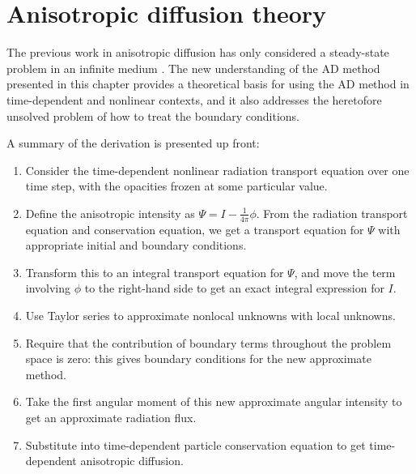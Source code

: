 
\newcommand{\epsiloncolor}[1]{#1}
\chapter{Anisotropic diffusion theory}

The previous work in anisotropic diffusion has only considered a steady-state
problem in an infinite medium \cite{Lar2009c,Mor2007}. The new understanding of
the AD method presented in this chapter provides a theoretical basis for
using the AD method in time-dependent and nonlinear contexts, and it also
addresses the heretofore unsolved problem of how to treat the boundary
conditions.

A summary of the derivation is presented up front:
\prelistpar\begin{enumerate}
  \item Consider the time-dependent nonlinear radiation transport equation
    over one time step, with the opacities frozen at some particular value.
  \item Define the anisotropic intensity as $\Psi = I - \frac{1}{4\pi}\phi$.
    From the radiation transport equation and conservation equation, we get a
    transport equation for $\Psi$ with appropriate initial and boundary
    conditions.
  \item Transform this to an integral transport equation for $\Psi$, and move
    the term involving $\phi$ to the right-hand side to get an exact
    integral expression for $I$.
  \item Use Taylor series to approximate nonlocal unknowns with local
    unknowns.
  \item Require that the contribution of boundary terms throughout the problem
    space is zero: this gives boundary conditions for the new approximate
    method.
  \item Take the first angular moment of this new approximate angular
    intensity to get an approximate radiation flux.
  \item Substitute into time-dependent particle conservation equation to get
    time-dependent anisotropic diffusion.
\end{enumerate}

